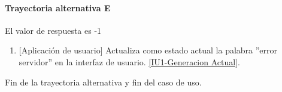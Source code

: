 \paragraph{Trayectoria alternativa E} \label{SUB-U-CU1.1:TE}
	El valor de respuesta es -1
	\begin{enumerate}[label=E\arabic*.]
		\item {[Aplicación de usuario]} Actualiza como estado actual la palabra ''error servidor'' en la interfaz de usuario. \hyperref[fig:monitoreo]{[IU1-Generacion Actual]}.
	\end{enumerate}
	Fin de la trayectoria alternativa y fin del caso de uso.